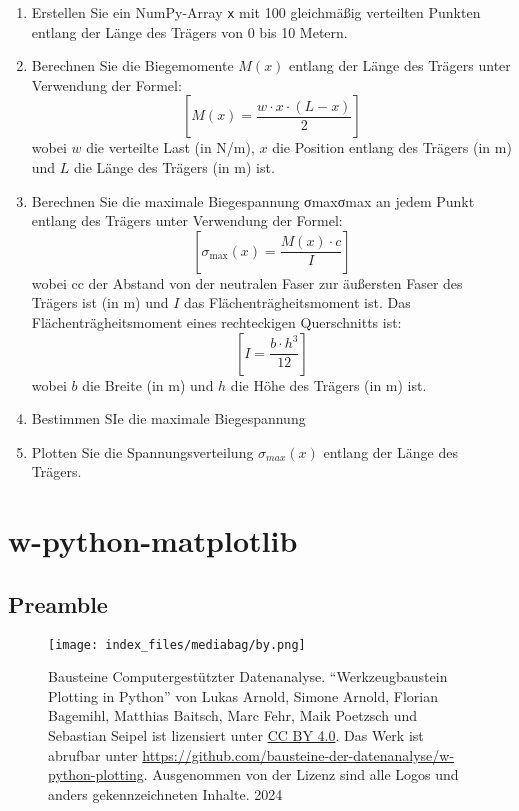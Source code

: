 \documentclass[
  letterpaper,
  DIV=11,
  numbers=noendperiod]{scrreprt}
\begin{document}
\begin{tcolorbox}
\begin{enumerate}
\def\labelenumi{\arabic{enumi}.}
\item
  Erstellen Sie ein NumPy-Array \texttt{x} mit 100 gleichmäßig
  verteilten Punkten entlang der Länge des Trägers von 0 bis 10 Metern.
\item
  Berechnen Sie die Biegemomente \(M(x)\) entlang der Länge des Trägers
  unter Verwendung der Formel: \[
  \left[M(x) = \frac{w \cdot x \cdot (L - x)}{2}\right]
  \] wobei \(w\) die verteilte Last (in N/m), \(x\) die Position entlang
  des Trägers (in m) und \(L\) die Länge des Trägers (in m) ist.
\item
  Berechnen Sie die maximale Biegespannung σmaxσmax\hspace{0pt} an jedem
  Punkt entlang des Trägers unter Verwendung der Formel: \[
  \left[\sigma_{\text{max}}(x) = \frac{M(x) \cdot c}{I}\right]
  \] wobei cc der Abstand von der neutralen Faser zur äußersten Faser
  des Trägers ist (in m) und \(I\) das Flächenträgheitsmoment ist. Das
  Flächenträgheitsmoment eines rechteckigen Querschnitts ist: \[
  \left[
  I = \frac{b \cdot h^3}{12}
  \right]
  \] wobei \(b\) die Breite (in m) und \(h\) die Höhe des Trägers (in m)
  ist.
\item
  Bestimmen SIe die maximale Biegespannung
\item
  Plotten Sie die Spannungsverteilung \(\sigma_{max}​(x)\) entlang der
  Länge des Trägers.
\end{enumerate}

\part{w-python-matplotlib}

\chapter*{Preamble}\label{preamble-1}


\label{Lizenz}
\begin{figure}

\begin{minipage}{0.20\linewidth}
\texttt{[image: index\_files/mediabag/by.png]}\end{minipage}%
%
\begin{minipage}{0.80\linewidth}
Bausteine Computergestützter Datenanalyse. ``Werkzeugbaustein Plotting
in Python'' von Lukas Arnold, Simone Arnold, Florian Bagemihl, Matthias
Baitsch, Marc Fehr, Maik Poetzsch und Sebastian Seipel ist lizensiert
unter \href{https://creativecommons.org/licenses/by/4.0/deed.de}{CC BY
4.0}. Das Werk ist abrufbar unter
\url{https://github.com/bausteine-der-datenanalyse/w-python-plotting}.
Ausgenommen von der Lizenz sind alle Logos und anders gekennzeichneten
Inhalte. 2024\end{minipage}%


\end{figure}
\end{tcolorbox}
\end{document}
